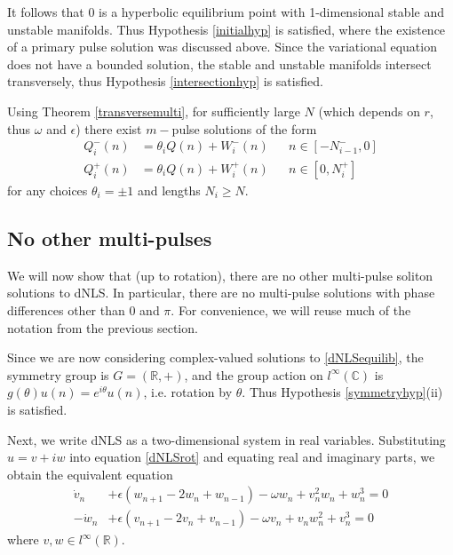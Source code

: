 \documentclass[12pt]{article}
\def\R{{\mathbb R}}
\def\C{{\mathbb C}}
\begin{document}
It follows that 0 is a hyperbolic equilibrium point with 1-dimensional stable and unstable manifolds. Thus Hypothesis \ref{initialhyp} is satisfied, where the existence of a primary pulse solution was discussed above. Since the variational equation does not have a bounded solution, the stable and unstable manifolds intersect transversely, thus Hypothesis \ref{intersectionhyp} is satisfied. 

Using Theorem \ref{transversemulti}, for sufficiently large $N$ (which depends on $r$, thus $\omega$ and $\epsilon$) there exist $m-$pulse solutions of the form
\begin{align*}
Q_i^-(n) &= \theta_i Q(n) + W_i^-(n) && n \in [-N_{i-1}^-, 0] \\
Q_i^+(n) &= \theta_i Q(n) + W_i^+(n) && n \in [0, N_i^+]
\end{align*}
for any choices $\theta_i = \pm 1$ and lengths $N_i \geq N$. 

\subsection{No other multi-pulses}

We will now show that (up to rotation), there are no other multi-pulse soliton solutions to dNLS. In particular, there are no multi-pulse solutions with phase differences other than $0$ and $\pi$. For convenience, we will reuse much of the notation from the previous section. 

Since we are now considering complex-valued solutions to \eqref{dNLSequilib}, the symmetry group is $G = (\R, +)$, and the group action on $l^\infty(\C)$ is $g(\theta)u(n) = e^{i \theta}u(n)$, i.e. rotation by $\theta$. Thus Hypothesis \ref{symmetryhyp}(ii) is satisfied.

Next, we write dNLS as a two-dimensional system in real variables. Substituting $u = v + i w$ into equation \eqref{dNLSrot} and equating real and imaginary parts, we obtain the equivalent equation
\begin{equation}\label{dNLSreal}
\begin{aligned}
\dot{v}_n  &+ \epsilon (w_{n+1} - 2 w_n + w_{n-1}) - \omega w_n + v_n^2 w_n + w_n^3 = 0 \\
-\dot{w}_n &+ \epsilon (v_{n+1} - 2 v_n + v_{n-1}) - \omega v_n + v_n w_n^2 + v_n^3 = 0
\end{aligned}
\end{equation}
where $v, w \in l^\infty(\R)$. 
\end{document}
